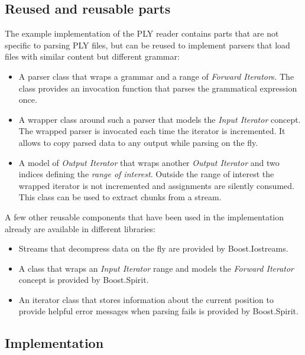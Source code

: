 \subsection{Reused and reusable parts}

The example implementation of the PLY reader contains parts that are not
specific to parsing PLY files, but can be reused to implement parsers that load
files with similar content but different grammar:

\begin{itemize}
  \item A parser class that wraps a grammar and a range of \emph{Forward
  Iterator}s. The class provides an invocation function that parses the
  grammatical expression once.
  \item A wrapper class around such a parser that models the \emph{Input
  Iterator} concept. The wrapped parser is invocated each time the iterator is
  incremented. It allows to copy parsed data to any output while parsing on the
  fly.
  \item A model of \emph{Output Iterator} that wraps another \emph{Output
  Iterator} and two indices defining the \emph{range of interest}. Outside the
  range of interest the wrapped iterator is not incremented and assignments are
  silently consumed. This class can be used to extract chunks from a stream.
\end{itemize}

A few other reusable components that have been used in the implementation
already are available in different libraries:

\begin{itemize}
  \item Streams that decompress data on the fly are provided by Boost.Iostreams.
  \item A class that wraps an \emph{Input Iterator} range and models the
  \emph{Forward Iterator} concept is provided by Boost.Spirit.
  \item An iterator class that stores information about the current position to
  provide helpful error messages when parsing fails is provided by Boost.Spirit.
\end{itemize}

\subsection{Implementation}

